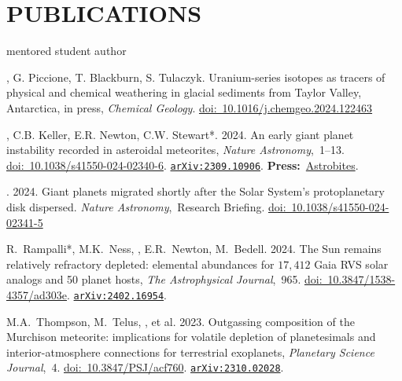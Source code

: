 \section*{PUBLICATIONS}
\hfill* mentored student author
\newcommand{\inprep}[1]{in prep, \textit{#1}}
\newcommand{\submitted}[1]{submitted, \textit{#1}}
\newcommand{\inreview}[1]{in review, \textit{#1}}
\newcommand{\inpress}[1]{in press, \textit{#1}}
\newcommand{\doi}[1]{\href{https://doi.org/#1}{doi:~#1}}
\newcommand{\arxiv}[1]{\href{https://arxiv.org/abs/#1}{\texttt{arXiv:#1}}}
\newcommand{\press}[2]{\textbf{Press:}~\href{#1}{#2}}
\newcommand{\pub}[2]{\textit{#1},~#2}

\begin{etaremune} [itemsep=4pt, leftmargin=3ex]
    \item \ghedwards, G. Piccione, T. Blackburn,  S. Tulaczyk. Uranium-series isotopes as tracers of physical and chemical weathering in glacial sediments from Taylor Valley, Antarctica, \inpress{Chemical Geology}. \doi{10.1016/j.chemgeo.2024.122463}
        
    \item \ghedwards, C.B. Keller, E.R. Newton, C.W. Stewart*. 2024. An early giant planet instability recorded in asteroidal meteorites, \pub{Nature Astronomy}{1--13}. \doi{10.1038/s41550-024-02340-6}. \arxiv{2309.10906}. \press{https://astrobites.org/2023/09/25/meteorites-planet-migration/}{Astrobites}.
    
    \item \ghedwards. 2024. Giant planets migrated shortly after the Solar System’s protoplanetary disk dispersed. \pub{Nature Astronomy} Research Briefing. \doi{10.1038/s41550-024-02341-5}
    
    \item R.~Rampalli*, M.K.~Ness, \ghedwards, E.R.~Newton, M.~Bedell. 2024. The Sun remains relatively refractory depleted: elemental abundances for $17,412$ Gaia RVS solar analogs and 50 planet hosts, \pub{The Astrophysical Journal}{965}. \doi{10.3847/1538-4357/ad303e}. \arxiv{2402.16954}.
    
    \item M.A.~Thompson, M.~Telus, \ghedwards, et al. 2023. Outgassing composition of the Murchison meteorite: implications for volatile depletion of planetesimals and interior-atmosphere connections for terrestrial exoplanets, \pub{Planetary Science Journal}{4}. \doi{10.3847/PSJ/acf760}. \arxiv{2310.02028}.
    

\end{etaremune}
